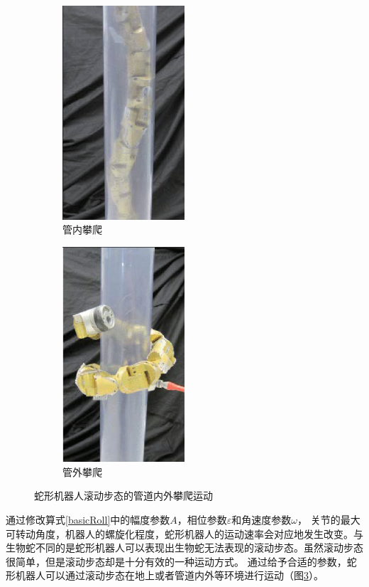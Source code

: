 \begin{figure}[htbp] %
	\begin{subfigure}{0.5\textwidth}
		\centering
		\includegraphics[width=0.5\textwidth]{figure/chap03/pipecrawl.eps}
		\caption{管内攀爬}
		\label{fig:pipecrawl}
	\end{subfigure}
	\begin{subfigure}{0.5\textwidth}
		\centering
		\includegraphics[width=0.5\textwidth]{figure/chap03/poleclimb.eps}
		\caption{管外攀爬}
		\label{fig:poleclimb}
	\end{subfigure}
	\caption{蛇形机器人滚动步态的管道内外攀爬运动}
	\label{fig:polecc}
\end{figure}

通过修改算式\ref{basicRoll}中的幅度参数$A$，相位参数$\varepsilon$和角速度参数$\omega$， 关节的最大可转动角度，机器人的螺旋化程度，蛇形机器人的运动速率会对应地发生改变。与生物蛇不同的是蛇形机器人可以表现出生物蛇无法表现的滚动步态。虽然滚动步态很简单，但是滚动步态却是十分有效的一种运动方式。 通过给予合适的参数，蛇形机器人可以通过滚动步态在地上或者管道内外等环境进行运动（图\ref{fig:polecc}）。

